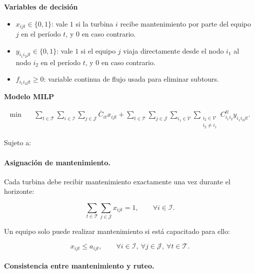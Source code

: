 \medskip
\noindent\textbf{Variables de decisión}\par

\begin{itemize}
    \item $x_{ijt}\in\{0,1\}$: vale $1$ si la turbina $i$ recibe mantenimiento por parte del equipo $j$ en el período $t$, y $0$ en caso contrario.
    \item $y_{i_1 i_2 jt}\in\{0,1\}$: vale $1$ si el equipo $j$ viaja directamente desde el nodo $i_1$ al nodo $i_2$ en el período $t$, y $0$ en caso contrario.
    \item $f_{i_1 i_2 jt}\geq 0$: variable continua de flujo usada para eliminar subtours.
\end{itemize}

\medskip
\noindent\textbf{Modelo MILP}\par

\begin{equation}
\begin{aligned}
\min \quad 
& \sum_{t\in\mathcal{T}}
  \sum_{i\in\mathcal{I}}
  \sum_{j\in\mathcal{J}}
  \bar{C}_{it}x_{ijt}
  +
  \sum_{t\in\mathcal{T}}
  \sum_{j\in\mathcal{J}}
  \sum_{i_1\in\mathcal{V}}
  \sum_{\substack{i_2\in\mathcal{V}\\ i_2\neq i_1}}
  C^{tl}_{i_1 i_2}y_{i_1 i_2 jt}.
\end{aligned}
\end{equation}

Sujeto a:

\paragraph{Asignación de mantenimiento.}

Cada turbina debe recibir mantenimiento exactamente una vez durante el horizonte:

\begin{equation}
\sum_{t\in\mathcal{T}}
\sum_{j\in\mathcal{J}}
x_{ijt}
=1,
\qquad \forall i\in\mathcal{I}.
\end{equation}

Un equipo solo puede realizar mantenimiento si está capacitado para ello:

\begin{equation}
x_{ijt}\leq a_{ijt},
\qquad \forall i\in\mathcal{I},\ \forall j\in\mathcal{J},\ \forall t\in\mathcal{T}.
\end{equation}

\paragraph{Consistencia entre mantenimiento y ruteo.}

